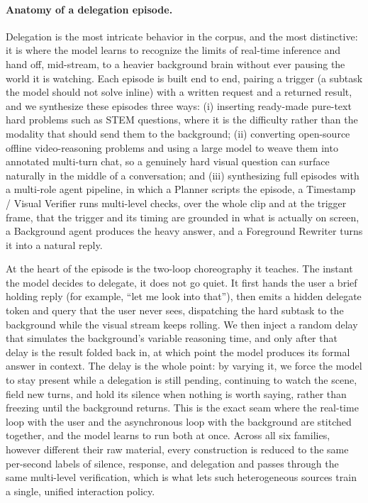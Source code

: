 \documentclass{llmxive}
\begin{document}
\paragraph{\textbf{Anatomy of a delegation episode.}}
Delegation is the most intricate behavior in the corpus, and the most distinctive: it is where the model learns to recognize the limits of real-time inference and hand off, mid-stream, to a heavier background brain without ever pausing the world it is watching. Each episode is built end to end, pairing a trigger (a subtask the model should not solve inline) with a written request and a returned result, and we synthesize these episodes three ways: (i) inserting ready-made pure-text hard problems such as STEM questions, where it is the difficulty rather than the modality that should send them to the background; (ii) converting open-source offline video-reasoning problems and using a large model to weave them into annotated multi-turn chat, so a genuinely hard visual question can surface naturally in the middle of a conversation; and (iii) synthesizing full episodes with a multi-role agent pipeline, in which a Planner scripts the episode, a Timestamp / Visual Verifier runs multi-level checks, over the whole clip and at the trigger frame, that the trigger and its timing are grounded in what is actually on screen, a Background agent produces the heavy answer, and a Foreground Rewriter turns it into a natural reply.


At the heart of the episode is the two-loop choreography it teaches. The instant the model decides to delegate, it does not go quiet. It first hands the user a brief holding reply (for example, ``let me look into that''), then emits a hidden delegate token and query that the user never sees, dispatching the hard subtask to the background while the visual stream keeps rolling. We then inject a random delay that simulates the background's variable reasoning time, and only after that delay is the result folded back in, at which point the model produces its formal answer in context. The delay is the whole point: by varying it, we force the model to stay present while a delegation is still pending, continuing to watch the scene, field new turns, and hold its silence when nothing is worth saying, rather than freezing until the background returns. This is the exact seam where the real-time loop with the user and the asynchronous loop with the background are stitched together, and the model learns to run both at once. Across all six families, however different their raw material, every construction is reduced to the same per-second labels of silence, response, and delegation and passes through the same multi-level verification, which is what lets such heterogeneous sources train a single, unified interaction policy.
\end{document}
